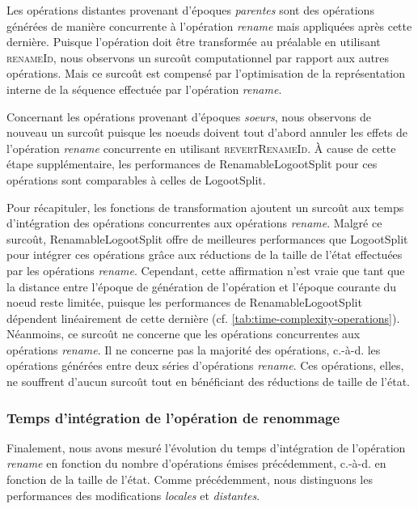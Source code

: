 \documentclass[12pt]{thesul}
\newcommand{\ie}{c.-à-d. }
\begin{document}
Les opérations distantes provenant d'époques \emph{parentes} sont des opérations générées de manière concurrente à l'opération \emph{rename} mais appliquées après cette dernière.
Puisque l'opération doit être transformée au préalable en utilisant \textsc{renameId}, nous observons un surcoût computationnel par rapport aux autres opérations.
Mais ce surcoût est compensé par l'optimisation de la représentation interne de la séquence effectuée par l'opération \emph{rename}.

Concernant les opérations provenant d'époques \emph{soeurs}, nous observons de nouveau un surcoût puisque les noeuds doivent tout d'abord annuler les effets de l'opération \emph{rename} concurrente en utilisant \textsc{revertRenameId}.
À cause de cette étape supplémentaire, les performances de RenamableLogootSplit pour ces opérations sont comparables à celles de LogootSplit.

Pour récapituler, les fonctions de transformation ajoutent un surcoût aux temps d'intégration des opérations concurrentes aux opérations \emph{rename}.
Malgré ce surcoût, RenamableLogootSplit offre de meilleures performances que LogootSplit pour intégrer ces opérations grâce aux réductions de la taille de l'état effectuées par les opérations \emph{rename}.
Cependant, cette affirmation n'est vraie que tant que la distance entre l'époque de génération de l'opération et l'époque courante du noeud reste limitée, puisque les performances de RenamableLogootSplit dépendent linéairement de cette dernière (cf. \autoref{tab:time-complexity-operations}).
Néanmoins, ce surcoût ne concerne que les opérations concurrentes aux opérations \emph{rename}.
Il ne concerne pas la majorité des opérations, \ie les opérations générées entre deux séries d'opérations \emph{rename}.
Ces opérations, elles, ne souffrent d'aucun surcoût tout en bénéficiant des réductions de taille de l'état.

\subsubsection{Temps d'intégration de l'opération de renommage}

Finalement, nous avons mesuré l'évolution du temps d'intégration de l'opération \emph{rename} en fonction du nombre d'opérations émises précédemment, \ie en fonction de la taille de l'état.
Comme précédemment, nous distinguons les performances des modifications \emph{locales} et \emph{distantes}.
\end{document}
